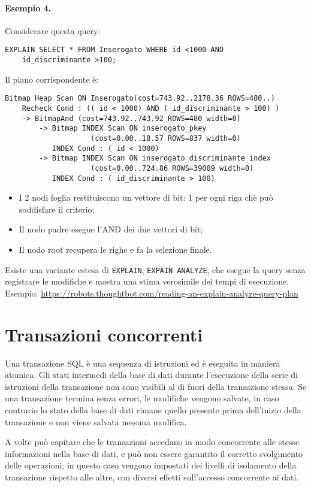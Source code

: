\documentclass[a4paper, 10pt, titlepage]{article}
\begin{document}
\paragraph{Esempio 4.}
		Considerare questa query:
	\begin{lstlisting}
EXPLAIN SELECT * FROM Inserogato WHERE id <1000 AND
	id_discriminante >100;
	\end{lstlisting}
	Il piano corrispondente è:
	\begin{lstlisting}
Bitmap Heap Scan ON Inserogato(cost=743.92..2178.36 ROWS=480..)
	Recheck Cond : (( id < 1000) AND ( id_discriminante > 100) )
	-> BitmapAnd (cost=743.92..743.92 ROWS=480 width=0)
		-> Bitmap INDEX Scan ON inserogato_pkey
					(cost=0.00..18.57 ROWS=837 width=0)
		   INDEX Cond : ( id < 1000)
		-> Bitmap INDEX Scan ON inserogato_discriminante_index
					(cost=0.00..724.86 ROWS=39009 width=0)
		   INDEX Cond : ( id_discriminante > 100)
	\end{lstlisting}
	\begin{itemize}
	\item I 2 nodi foglia restituiscono un vettore di bit: 1 per ogni riga chè può soddisfare il criterio;
	\item Il nodo padre esegue l'AND dei due vettori di bit;
	\item Il nodo root recupera le righe e fa la selezione finale.
	\end{itemize}  \medskip
	Esiste una variante estesa di \lstinline|EXPLAIN|, \lstinline|EXPAIN ANALYZE|, che esegue la query senza registrare le modifiche e mostra una stima verosimile dei tempi di esecuzione.\\
	Esempio:
	\url{https://robots.thoughtbot.com/reading-an-explain-analyze-query-plan}

	\newpage
	
		\section{Transazioni concorrenti}
	Una transazione SQL è una sequenza di istruzioni ed è eseguita in maniera atomica.
	Gli stati intermedi della base di dati durante l'esecuzione della serie di istruzioni della transazione non sono visibili al di fuori della transazione stessa.
	Se una transazione termina senza errori, le modifiche vengono salvate, in caso contrario lo stato della base di dati rimane quello presente prima dell'inizio della transazione e non viene salvata nessuna modifica.
	
	A volte può capitare che le transazioni accedano in modo concorrente alle stesse informazioni nella base di dati, e può non essere garantito il corretto svolgimento delle operazioni; in questo caso vengono impostati dei livelli di isolamento della transazione rispetto alle altre, con diversi effetti sull'accesso concorrente ai dati.
	
\end{document}
